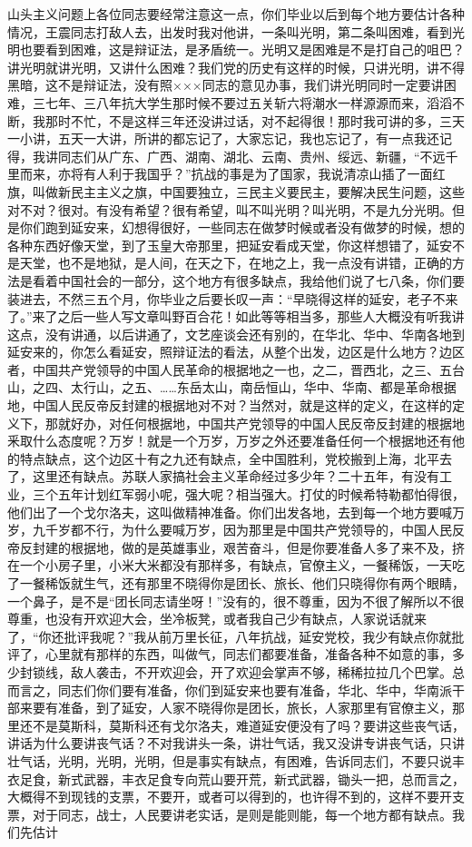 山头主义问题上各位同志要经常注意这一点，你们毕业以后到每个地方要估计各种情况，王震同志打敌人去，出发时我对他讲，一条叫光明，第二条叫困难，看到光明也要看到困难，这是辩证法，是矛盾统一。光明又是困难是不是打自己的咀巴？讲光明就讲光明，又讲什么困难？我们党的历史有这样的时候，只讲光明，讲不得黑暗，这不是辩证法，没有照×××同志的意见办事，我们讲光明同时一定要讲困难，三七年、三八年抗大学生那时候不要过五关斩六将潮水一样源源而来，滔滔不断，我那时不忙，不是这样三年还没讲过话，对不起得很！那时我可讲的多，三天一小讲，五天一大讲，所讲的都忘记了，大家忘记，我也忘记了，有一点我还记得，我讲同志们从广东、广西、湖南、湖北、云南、贵州、绥远、新疆，“不远千里而来，亦将有人利于我国乎？”抗战的事是为了国家，我说清凉山插了一面红旗，叫做新民主主义之旗，中国要独立，三民主义要民主，要解决民生问题，这些对不对？很对。有没有希望？很有希望，叫不叫光明？叫光明，不是九分光明。但是你们跑到延安来，幻想得很好，一些同志在做梦时候或者没有做梦的时候，想的各种东西好像天堂，到了玉皇大帝那里，把延安看成天堂，你这样想错了，延安不是天堂，也不是地狱，是人间，在天之下，在地之上，我一点没有讲错，正确的方法是看着中国社会的一部分，这个地方有很多缺点，我给他们说了七八条，你们要装进去，不然三五个月，你毕业之后要长叹一声：“早晓得这样的延安，老子不来了。”来了之后一些人写文章叫野百合花！如此等等相当多，那些人大概没有听我讲这点，没有讲通，以后讲通了，文艺座谈会还有别的，在华北、华中、华南各地到延安来的，你怎么看延安，照辩证法的看法，从整个出发，边区是什么地方？边区者，中国共产党领导的中国人民革命的根据地之一也，之二，晋西北，之三、五台山，之四、太行山，之五、……东岳太山，南岳恒山，华中、华南、都是革命根据地，中国人民反帝反封建的根据地对不对？当然对，就是这样的定义，在这样的定义下，那就好办，对任何根据地，中国共产党领导的中国人民反帝反封建的根据地釆取什么态度呢？万岁！就是一个万岁，万岁之外还要准备任何一个根据地还有他的特点缺点，这个边区十有之九还有缺点，全中国胜利，党校搬到上海，北平去了，这里还有缺点。苏联人家搞社会主义革命经过多少年？二十五年，有没有工业，三个五年计划红军弱小呢，强大呢？相当强大。打仗的时候希特勒都怕得很，他们出了一个戈尔洛夫，这叫做精神准备。你们出发各地，去到每一个地方要喊万岁，九千岁都不行，为什么要喊万岁，因为那里是中国共产党领导的，中国人民反帝反封建的根据地，做的是英雄事业，艰苦奋斗，但是你要准备人多了来不及，挤在一个小房子里，小米大米都没有那样多，有缺点，官僚主义，一餐稀饭，一天吃了一餐稀饭就生气，还有那里不晓得你是团长、旅长、他们只晓得你有两个眼睛，一个鼻子，是不是“团长同志请坐呀！”没有的，很不尊重，因为不很了解所以不很尊重，也没有开欢迎大会，坐冷板凳，或者我自己少有缺点，人家说话就来了，“你还批评我呢？”我从前万里长征，八年抗战，延安党校，我少有缺点你就批评了，心里就有那样的东西，叫做气，同志们都要准备，准备各种不如意的事，多少封锁线，敌人袭击，不开欢迎会，开了欢迎会掌声不够，稀稀拉拉几个巴掌。总而言之，同志们你们要有准备，你们到延安来也要有准备，华北、华中，华南派干部来要有准备，到了延安，人家不晓得你是团长，旅长，人家那里有官僚主义，那里还不是莫斯科，莫斯科还有戈尔洛夫，难道延安便没有了吗？要讲这些丧气话，讲话为什么要讲丧气话？不对我讲头一条，讲壮气话，我又没讲专讲丧气话，只讲壮气话，光明，光明，光明，但是事实有缺点，有困难，告诉同志们，不要只说丰衣足食，新式武器，丰衣足食专向荒山要开荒，新式武器，锄头一把，总而言之，大概得不到现钱的支票，不要开，或者可以得到的，也许得不到的，这样不要开支票，对于同志，战士，人民要讲老实话，是则是能则能，每一个地方都有缺点。我们先估计